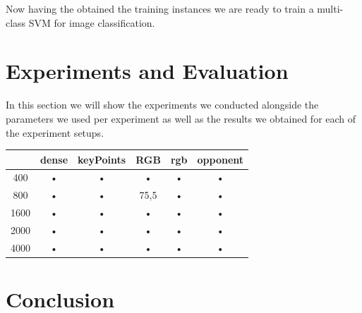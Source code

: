 \documentclass[11pt]{article}
\begin{document}
Now having the obtained the training instances we are ready to train a multi-class SVM for image classification.

\section{Experiments and Evaluation}
In this section we will show the experiments we conducted alongside the parameters we used per experiment as well as the results we obtained for each of the experiment setups.

\begin{table}
\begin{tabular}{c|ccccc}
 & dense & keyPoints & RGB & rgb & opponent \\ 
\hline 
400 & • & • & • & • & • \\ 
800 & • & • & 75,5 & • & • \\ 
1600 & • & • & • & • & • \\ 
2000 & • & • & • & • & • \\ 
4000 & • & • & • & • & • \\ 
\end{tabular}
\label{Accuracy of the different models}
\end{table}

\section{Conclusion}

{}

\end{document}
